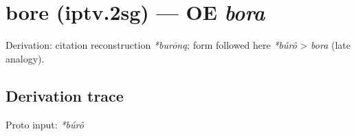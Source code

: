 \documentclass[
  british,
  a4paper,
  openany]{book}
\providecommand{\texorpdfstring}[2]{#1}
\begin{document}
\section{\texorpdfstring{bore (iptv.2sg) --- OE
\emph{bora}}{bore (iptv.2sg) --- OE bora}}\label{bore-iptv.2sg-oe-bora}


Derivation: citation reconstruction \emph{*burōną}; form followed here
\emph{*búrô} \textgreater{} \emph{bora} (late analogy).

\subsection{Derivation trace}\label{derivation-trace-128}

Proto input: \emph{*búrô}

\begingroup
\setlength{\fboxsep}{6pt}
\end{document}
